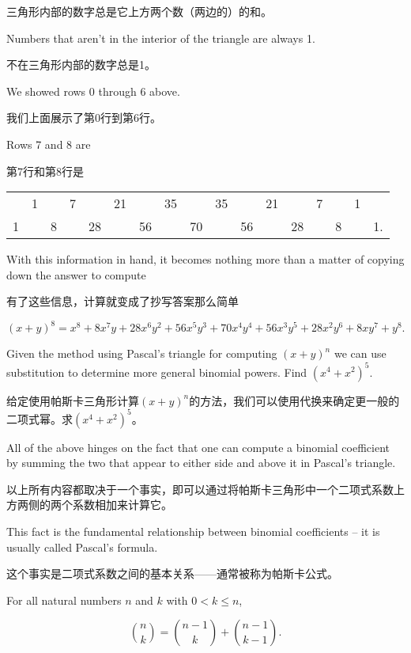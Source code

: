三角形内部的数字总是它上方两个数（两边的）的和。

Numbers that aren't in the interior of the
triangle are always 1.

不在三角形内部的数字总是1。

We showed rows 0 through 6 above.

我们上面展示了第0行到第6行。

Rows 7 and 8 are

第7行和第8行是

\begin{center}
\begin{tabular}{ccccccccccccccccc}
   & 1 &   & 7 &    & 21 &    & 35 &    & 35 &    & 21 &    & 7 &   & 1 & \\
 1 &   & 8 &   & 28 &    & 56 &    & 70 &    & 56 &    & 28 &   & 8 &   & 1. \\ \end{tabular}
\end{center}

With this information in hand, it becomes nothing more than a matter of copying
down the answer to compute

有了这些信息，计算就变成了抄写答案那么简单

\[ (x+y)^8 =  x^8 + 8x^7y + 28x^6y^2 + 56x^5y^3 + 70x^4y^4 + 56x^3y^5 + 28x^2y^6 + 8xy^7 + y^8. \]

\begin{exer} 
Given the method using Pascal's triangle for computing $(x+y)^n$ we can
use substitution to determine more general binomial powers.
Find $(x^4 + x^2)^5$.
\end{exer}

\begin{exer}
给定使用帕斯卡三角形计算$(x+y)^n$的方法，我们可以使用代换来确定更一般的二项式幂。求$(x^4 + x^2)^5$。
\end{exer}

All of the above hinges on the fact that one can compute a binomial
coefficient by summing the two that appear to either side and above it
in Pascal's triangle.

以上所有内容都取决于一个事实，即可以通过将帕斯卡三角形中一个二项式系数上方两侧的两个系数相加来计算它。

This fact is the fundamental relationship
between binomial coefficients -- it is usually called Pascal's formula.

这个事实是二项式系数之间的基本关系——通常被称为帕斯卡公式。

\begin{thm}
For all natural numbers $n$ and $k$ with $0 < k \leq n$,

\[ \binom{n}{k} = \binom{n-1}{k} + \binom{n-1}{k-1}. \]
\end{thm}

